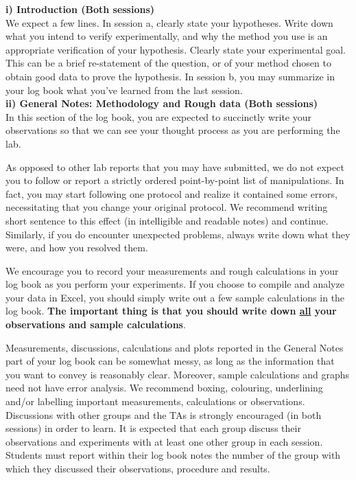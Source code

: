 \documentclass[12pt]{report}
\begin{document}
\noindent \textbf{i) Introduction (Both sessions)} \\
\noindent We expect a few lines. In session a, clearly state your hypotheses. Write down what you intend to verify experimentally, and why the method you use is an appropriate verification of your hypothesis. Clearly state your experimental goal. This can be a brief re-statement of the question, or of your method chosen to obtain good data to prove the hypothesis.
In session b, you may summarize in your log book what you've learned from the last session. \\

\noindent \textbf{ii) General Notes: Methodology and Rough data (Both sessions)} \\
In this section of the log book, you are  expected to succinctly write  your observations so that we can see your thought process as you are performing the lab. 

As opposed to other lab reports that you may have submitted, we do not expect you to follow or report a strictly ordered point-by-point list of manipulations. In fact, you may start following one protocol and realize it contained  some errors, necessitating that you change your original protocol. We recommend writing short sentence to this effect (in intelligible and readable notes) and continue. Similarly, if you do encounter unexpected problems, always write down what they were, and how you resolved them.

We encourage you to record your measurements and rough calculations in your log book as you perform your experiments. If you choose to compile and analyze your data in Excel, you should simply write out a few sample calculations in the log book.  \textbf{ The important thing is that you should write down \underline{all} your observations and sample calculations}. 

Measurements, discussions, calculations and plots reported in  the General Notes part of your log book can be somewhat messy, as long as the information that you want to convey is reasonably clear.  Moreover, sample calculations and graphs need not have error analysis. We recommend boxing, colouring, underlining and/or labelling important measurements, calculations or observations. Discussions with other groups and the TAs is strongly encouraged (in both sessions) in order to learn. 
It is expected that each group discuss their observations and experiments with at least one other group in each session.
Students must report within their log book notes the number of the group with which they discussed their observations, procedure and results.   \\
\end{document}
